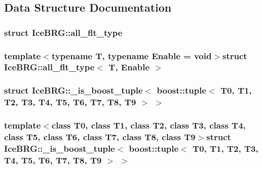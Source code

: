 \subsection{Data Structure Documentation}
\label{structIceBRG_1_1all__flt__type}
\hypertarget{namespaceIceBRG_structIceBRG_1_1all__flt__type}{}
\subsubsection{struct Ice\-B\-R\-G\-:\-:all\-\_\-flt\-\_\-type}
\subsubsection*{template$<$typename T, typename Enable = void$>$struct Ice\-B\-R\-G\-::all\-\_\-flt\-\_\-type$<$ T, Enable $>$}

\label{structIceBRG_1_1__is__boost__tuple_3_01boost_1_1tuple_3_01T0_00_01T1_00_01T2_00_01T3_00_01T4_00_aeaacd25f11a77396b5b6e53a5953fba}
\hypertarget{namespaceIceBRG_structIceBRG_1_1__is__boost__tuple_3_01boost_1_1tuple_3_01T0_00_01T1_00_01T2_00_01T3_00_01T4_00_aeaacd25f11a77396b5b6e53a5953fba}{}
\subsubsection{struct Ice\-B\-R\-G\-:\-:\-\_\-is\-\_\-boost\-\_\-tuple$<$ boost\-:\-:tuple$<$ T0, T1, T2, T3, T4, T5, T6, T7, T8, T9 $>$ $>$}
\subsubsection*{template$<$class T0, class T1, class T2, class T3, class T4, class T5, class T6, class T7, class T8, class T9$>$struct Ice\-B\-R\-G\-::\-\_\-is\-\_\-boost\-\_\-tuple$<$ boost\-::tuple$<$ T0, T1, T2, T3, T4, T5, T6, T7, T8, T9 $>$ $>$}

\label{structIceBRG_1_1__is__boost__tuple_3_01boost_1_1tuples_1_1cons_3_01TH_00_01TT_01_4_01_4}
\hypertarget{namespaceIceBRG_structIceBRG_1_1__is__boost__tuple_3_01boost_1_1tuples_1_1cons_3_01TH_00_01TT_01_4_01_4}{}
